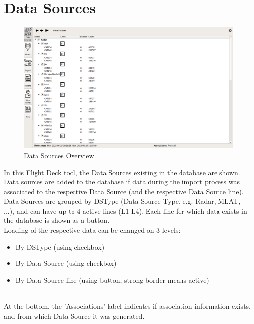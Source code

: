 \section{Data Sources}
\label{sec:data_sources}

\begin{figure}[H]
    \hspace*{-2.5cm}
    \includegraphics[width=19cm,frame]{figures/ui_data_sources.png}
  \caption{Data Sources Overview}
\end{figure}

In this Flight Deck tool, the Data Sources existing in the database are shown. 
Data sources are added to the database if data during the import process was associated to the respective Data Source (and the respective Data Source line). \\

Data Sources are grouped by DSType (Data Source Type, e.g. Radar, MLAT, ...), and can have up to 4 active lines (L1-L4). Each line for which data exists in the database is shown as a button. \\

Loading of the respective data can be changed on 3 levels:

\begin{itemize}
 \item By DSType (using checkbox)
 \item By Data Source (using checkbox)
 \item By Data Source line (using button, strong border means active)
\end{itemize}
\  \\

At the bottom, the 'Associations' label indicates if association information exists, and from which Data Source it was generated.\newline

